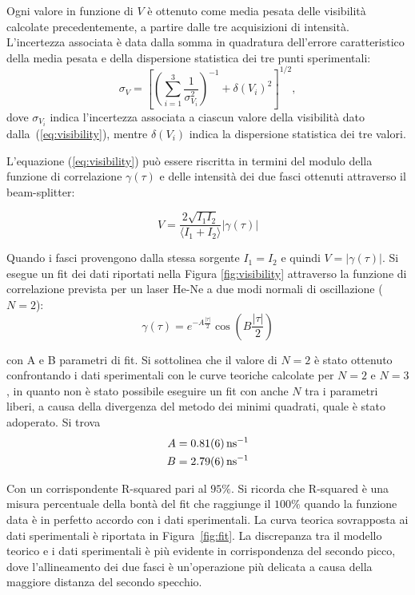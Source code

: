 \documentclass[10pt,oneside,a4paper]{article}
\begin{document}
\begin{multicols}{2}
Ogni valore in funzione di $V$ è ottenuto come media pesata delle visibilità calcolate precedentemente, a partire dalle tre acquisizioni di intensità. L'incertezza associata è data dalla somma in quadratura dell'errore caratteristico della media pesata e della dispersione statistica dei tre punti sperimentali:
\[
\sigma_V = \left[ \left( \sum_{i=1}^3 \frac{1}{\sigma_\text{$V_i$}^2}\right)^{-1} + \delta(V_i)^2 \right]^{1/2}, 
\]
dove $\sigma_\text{$V_i$}$ indica l'incertezza associata a ciascun valore della visibilità dato dalla~(\ref{eq:visibility}), mentre $\delta(V_i)$ indica la dispersione statistica dei tre valori.

L'equazione (\ref{eq:visibility}) può essere riscritta in termini del modulo della funzione di correlazione $\gamma(\tau)$ e delle intensità dei due fasci ottenuti attraverso il beam-splitter:

\begin{equation}\label{eq:visibility2}
V = \frac{2\sqrt{I_1 I_2}}{\langle I_1 + I_2 \rangle}\vert \gamma(\tau) \vert
\end{equation}

Quando i fasci provengono dalla stessa sorgente $I_1=I_2$ e quindi $V = \vert\gamma(\tau)\vert$. Si esegue un fit dei dati riportati nella Figura \ref{fig:visibility} attraverso la funzione di correlazione prevista per un laser He-Ne a due modi normali di oscillazione ($N=2$):
\[
\gamma(\tau) = e^{-A\frac{\vert\tau\vert}{2}}\cos\left({B\frac{\vert\tau\vert}{2}}\right)
\]

con A e B parametri di fit. Si sottolinea che il valore di $N=2$ è stato ottenuto confrontando i dati sperimentali con le curve teoriche calcolate per $N=2$ e $N=3$, in quanto non è stato possibile eseguire un fit con anche $N$ tra i parametri liberi, a causa della divergenza del metodo dei minimi quadrati, quale è stato adoperato. Si trova
\[
\begin{aligned}
A &= \SI{0.81 \pm 0.06}{\nano\second}^{-1} \\
B &= \SI{2.79 \pm 0.06}{\nano\second}^{-1} \\
\end{aligned}
\]

Con un corrispondente R-squared pari al $95\%$. Si ricorda che R-squared è una misura percentuale della bontà del fit che raggiunge il $100\%$ quando la funzione data è in perfetto accordo con i dati sperimentali. La curva teorica sovrapposta ai dati sperimentali è riportata in Figura~\ref{fig:fit}. La discrepanza tra il modello teorico e i dati sperimentali è più evidente in corrispondenza del secondo picco, dove l'allineamento dei due fasci è un'operazione più delicata a causa della maggiore distanza del secondo specchio.


\end{multicols}
\end{document}
